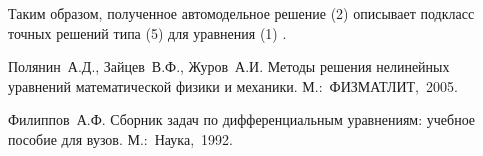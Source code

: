 Таким образом, полученное автомодельное решение (2)  описывает подкласс точных решений типа  (5) для уравнения (1) .


\begin{thebibliography}{99}
Полянин~А.Д., Зайцев~В.Ф., Журов~А.И. Методы решения нелинейных уравнений математической физики и механики. М.:~ФИЗМАТЛИТ,~2005.

Филиппов~А.Ф. Сборник задач по дифференциальным уравнениям: учебное пособие для вузов. М.:~Наука,~1992.
\end{thebibliography}






%

